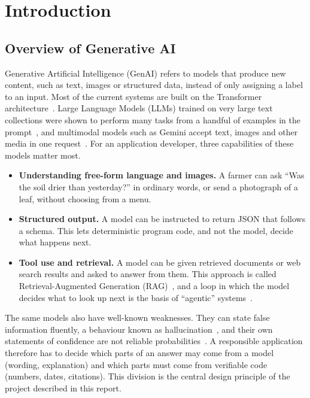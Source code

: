 \chapter{Introduction}

\section{Overview of Generative AI}

Generative Artificial Intelligence (GenAI) refers to models that produce new content, such as text, images or
structured data, instead of only assigning a label to an input. Most of the current systems are built on the
Transformer architecture~\cite{vaswani2017attention}. Large Language Models (LLMs) trained on very large text
collections were shown to perform many tasks from a handful of examples in the prompt~\cite{brown2020gpt3}, and
multimodal models such as Gemini accept text, images and other media in one request~\cite{gemini2023,gemini25}.
For an application developer, three capabilities of these models matter most.

\begin{itemize}
\item \textbf{Understanding free-form language and images.} A farmer can ask ``Was the soil drier than yesterday?'' in
      ordinary words, or send a photograph of a leaf, without choosing from a menu.
\item \textbf{Structured output.} A model can be instructed to return JSON that follows a schema. This lets
      deterministic program code, and not the model, decide what happens next.
\item \textbf{Tool use and retrieval.} A model can be given retrieved documents or web search results and asked to
      answer from them. This approach is called Retrieval-Augmented Generation (RAG)~\cite{lewis2020rag,gao2023ragsurvey},
      and a loop in which the model decides what to look up next is the basis of ``agentic''
      systems~\cite{yao2023react,wang2024agents}.
\end{itemize}

The same models also have well-known weaknesses. They can state false information fluently, a behaviour known as
hallucination~\cite{ji2023hallucination}, and their own statements of confidence are not reliable
probabilities~\cite{kadavath2022know,xiong2024uncertainty}. A responsible application therefore has to
decide which parts of an answer may come from a model (wording, explanation) and which parts must come from
verifiable code (numbers, dates, citations). This division is the central design principle of the project described
in this report.

